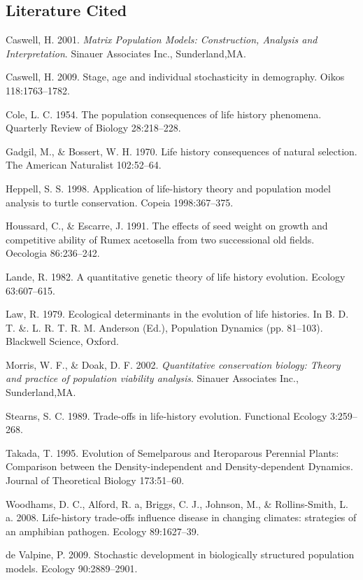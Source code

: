 \documentclass[]{article}
\begin{document}
\subsection{Literature Cited}

Caswell, H. 2001. \emph{Matrix Population Models: Construction, Analysis
and Interpretation}. Sinauer Associates Inc., Sunderland,MA.

Caswell, H. 2009. Stage, age and individual stochasticity in demography.
Oikos 118:1763--1782.

Cole, L. C. 1954. The population consequences of life history phenomena.
Quarterly Review of Biology 28:218--228.

Gadgil, M., \& Bossert, W. H. 1970. Life history consequences of natural
selection. The American Naturalist 102:52--64.

Heppell, S. S. 1998. Application of life-history theory and population
model analysis to turtle conservation. Copeia 1998:367--375.

Houssard, C., \& Escarre, J. 1991. The effects of seed weight on growth
and competitive ability of Rumex acetosella from two successional old
fields. Oecologia 86:236--242.

Lande, R. 1982. A quantitative genetic theory of life history evolution.
Ecology 63:607--615.

Law, R. 1979. Ecological determinants in the evolution of life
histories. In B. D. T. \&. L. R. T. R. M. Anderson (Ed.), Population
Dynamics (pp. 81--103). Blackwell Science, Oxford.

Morris, W. F., \& Doak, D. F. 2002. \emph{Quantitative conservation
biology: Theory and practice of population viability analysis}. Sinauer
Associates Inc., Sunderland,MA.

Stearns, S. C. 1989. Trade-offs in life-history evolution. Functional
Ecology 3:259--268.

Takada, T. 1995. Evolution of Semelparous and Iteroparous Perennial
Plants: Comparison between the Density-independent and Density-dependent
Dynamics. Journal of Theoretical Biology 173:51--60.

Woodhams, D. C., Alford, R. a, Briggs, C. J., Johnson, M., \&
Rollins-Smith, L. a. 2008. Life-history trade-offs influence disease in
changing climates: strategies of an amphibian pathogen. Ecology
89:1627--39.

de Valpine, P. 2009. Stochastic development in biologically structured
population models. Ecology 90:2889--2901.
\end{document}

